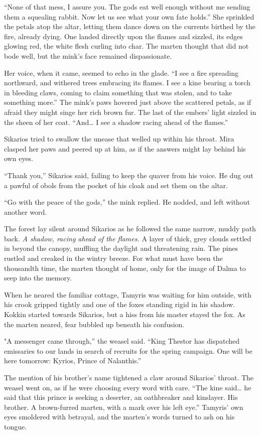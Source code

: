 ``None of that mess, I assure you. The gods eat well enough without me sending them a squealing rabbit. Now let us see what your own fate holds.'' She sprinkled the petals atop the altar, letting them dance down on the currents birthed by the fire, already dying. One landed directly upon the flames and sizzled, its edges glowing red, the white flesh curling into char. The marten thought that did not bode well, but the mink's face remained dispassionate.

Her voice, when it came, seemed to echo in the glade. ``I see a fire spreading northward, and withered trees embracing its flames. I see a kine bearing a torch in bleeding claws, coming to claim something that was stolen, and to take something more.'' The mink's paws hovered just above the scattered petals, as if afraid they might singe her rich brown fur. The last of the embers' light sizzled in the sheen of her coat. ``And\ldots{} I see a shadow racing ahead of the flames.''

Sikarios tried to swallow the unease that welled up within his throat. Mira clasped her paws and peered up at him, as if the answers might lay behind his own eyes.

``Thank you,'' Sikarios said, failing to keep the quaver from his voice. He dug out a pawful of obols from the pocket of his cloak and set them on the altar.

``Go with the peace of the gods,'' the mink replied. He nodded, and left without another word.

The forest lay silent around Sikarios as he followed the same narrow, muddy path back. \emph{A shadow, racing ahead of the flames.} A layer of thick, grey clouds settled in beyond the canopy, muffling the daylight and threatening rain. The pines rustled and creaked in the wintry breeze. For what must have been the thousandth time, the marten thought of home, only for the image of Dalma to seep into the memory.

When he neared the familiar cottage, Tamyris was waiting for him outside, with his crook gripped tightly and one of the foxes standing rigid in his shadow. Kokkin started towards Sikarios, but a hiss from his master stayed the fox. As the marten neared, fear bubbled up beneath his confusion.

"A messenger came through,'' the weasel said. ``King Thestor has dispatched emissaries to our lands in search of recruits for the spring campaign. One will be here tomorrow: Kyrios, Prince of Nalanthis.''

The mention of his brother's name tightened a claw around Sikarios' throat. The weasel went on, as if he were choosing every word with care. ``The kine said\ldots{} he said that this prince is seeking a deserter, an oathbreaker and kinslayer. His brother. A brown-furred marten, with a mark over his left eye.'' Tamyris' own eyes smoldered with betrayal, and the marten's words turned to ash on his tongue.

